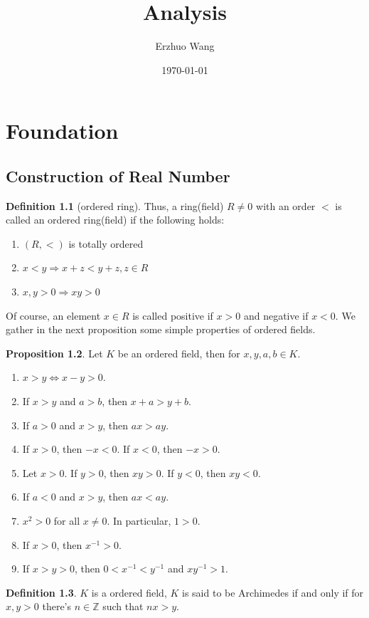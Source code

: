 \documentclass[12pt,a4paper]{book}
\newcommand{\bb}[1]{\mathbb{#1}}
\newenvironment{enu}{\begin{enumerate}[(1)]}{\end{enumerate}}
\theoremstyle{definition}
\newtheorem{defn}{Definition}[section]
\newtheorem{prop}[defn]{Proposition}
\begin{document}
\title{Analysis}
\author{Erzhuo Wang}
\date{\today}
\maketitle %
\tableofcontents
\chapter{Foundation}
\section{Construction of Real Number}
\begin{defn}[ordered ring]
    Thus, a ring(field) $R\neq 0$ with an order $<$ is called an ordered ring(field) if the following holds:
    \begin{enu}
        \item $(R,<)$ is totally ordered
        \item $x<y \Rightarrow x+z<y+z, z \in R$
        \item $x, y>0 \Rightarrow x y>0 $
    \end{enu}
    Of course, an element $x \in R$ is called positive if $x>0$ and negative if $x<0$. We gather in the next proposition some simple properties of ordered fields.
\end{defn}
\begin{prop}
    Let $K$ be an ordered field, then for $x, y, a, b \in K$.
    \begin{enumerate}[(1)]
        \item  $x>y \Leftrightarrow x-y>0$.
        \item  If $x>y$ and $a>b$, then $x+a>y+b$.
        \item  If $a>0$ and $x>y$, then $a x>a y$.
        \item If $x>0$, then $-x<0$. If $x<0$, then $-x>0$.
        \item Let $x>0$. If $y>0$, then $x y>0$. If $y<0$, then $x y<0$.
        \item  If $a<0$ and $x>y$, then $a x<a y$.
        \item  $x^2>0$ for all $x\neq 0$. In particular, $1>0$.
        \item  If $x>0$, then $x^{-1}>0$.
        \item  If $x>y>0$, then $0<x^{-1}<y^{-1}$ and $x y^{-1}>1$.
    \end{enumerate}
\end{prop}
\begin{defn}
    $K$ is a ordered field, $K$ is said to be Archimedes if and only if for $x,y>0$ there's $n\in \bb{Z}$ such that $nx>y$.
\end{defn}
\end{document}

